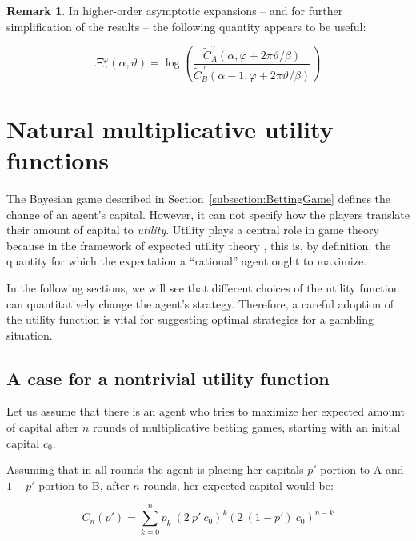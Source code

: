 \documentclass{article}
\theoremstyle{definition}
\newtheorem*{remark}{Remark}
\begin{document}
\begin{remark}
    In higher-order asymptotic expansions -- and for further simplification of the results -- the following quantity appears to be useful:

    \begin{equation}
    \Xi_\gamma^\varphi(\alpha,\vartheta) =
    \log \left (
    \frac{
    \widetilde{C}^\gamma_A(\alpha,\varphi + 2 \pi \vartheta / \beta )
    }
    {
    \widetilde{C}^\gamma_B(\alpha-1,\varphi + 2 \pi \vartheta / \beta )
    }
    \right )
    \end{equation}

\end{remark}




\section{Natural multiplicative utility functions}
\label{appendix:UtilityFunctions}

The Bayesian game described in Section~\ref{subsection:BettingGame} defines the change of an agent's capital. However, it can not specify how the players translate their amount of capital to \emph{utility}.
Utility plays a central role in game theory because in the framework of expected utility theory \cite{plato:ExpectedUtility}, this is, by definition, the quantity for which the expectation a ``rational'' agent ought to maximize.

In the following sections, we will see that different choices of the utility function can quantitatively change the agent's strategy. Therefore, a careful adoption of the utility function is vital for suggesting optimal strategies for a gambling situation.

\subsection{A case for a nontrivial utility function}

Let us assume that there is an agent who tries to maximize her expected amount of capital after $n$ rounds of multiplicative betting games, starting with an initial capital $c_0$.

Assuming that in all rounds the agent is placing her capitals $p'$ portion to A and $1-p'$ portion to B, after $n$ rounds, her expected capital would be:

\begin{equation}
    C_n(p') = \sum_{k=0}^n p_k \  (2 \ p' \ c_0)^k (2 \ (1-p') \ c_0)^{n-k}
\end{equation}
\end{document}

